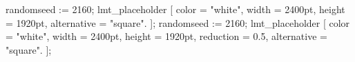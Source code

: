 \startMPpage
  randomseed := 2160;
  lmt_placeholder [
    color = "white",
    width = 2400pt,
    height = 1920pt,
    alternative = "square".
  ];
\stopMPpage
\startMPpage
  randomseed := 2160;
  lmt_placeholder [
    color = "white",
    width = 2400pt,
    height = 1920pt,
    reduction = 0.5,
    alternative = "square".
  ];
\stopMPpage
